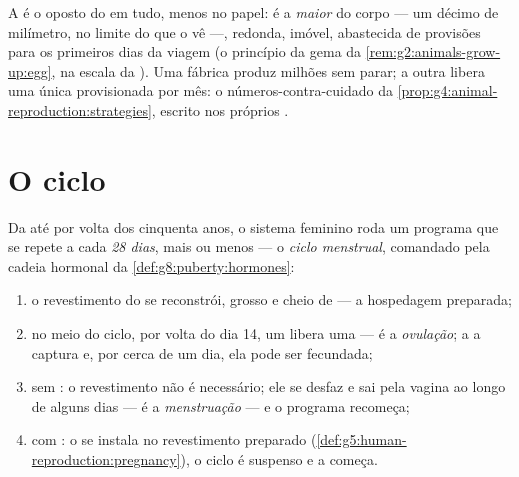 \begin{example}\label{ex:g8:reproductive-systems:egg}
A  é o oposto do  em tudo,
menos no papel: é a \emph{maior}  do corpo --- um décimo de
milímetro, no limite do que o  vê ---, redonda, imóvel, abastecida
de provisões para os primeiros dias da viagem (o princípio da gema da
\cref{rem:g2:animals-grow-up:egg}, na escala da ). Uma fábrica
produz milhões sem parar; a outra libera uma única  provisionada
por mês: o números-contra-cuidado da
\cref{prop:g4:animal-reproduction:strategies}, escrito nos próprios
.
\end{example}

\section{O ciclo}

\begin{proposition}\label{prop:g8:reproductive-systems:cycle}
Da  até por volta dos cinquenta anos, o sistema feminino roda
um programa que se repete a cada \emph{28 dias}, mais ou menos --- o
\emph{ciclo menstrual}, comandado pela cadeia
hormonal da \cref{def:g8:puberty:hormones}:
\begin{enumerate}
  \item o revestimento do  se reconstrói, grosso e cheio de
         --- a hospedagem preparada;
  \item no meio do ciclo, por volta do dia 14, um  libera uma
         --- é a
        \emph{ovulação}; a  a captura e,
        por cerca de um dia, ela pode ser fecundada;
  \item sem : o revestimento não é necessário; ele se
        desfaz e sai pela vagina ao longo de alguns dias --- é a
        \emph{menstruação} --- e o programa
        recomeça;
  \item com : o  se instala no revestimento preparado
        (\cref{def:g5:human-reproduction:pregnancy}), o ciclo é
        suspenso e a  começa.
\end{enumerate}
\end{proposition}
\admitted

